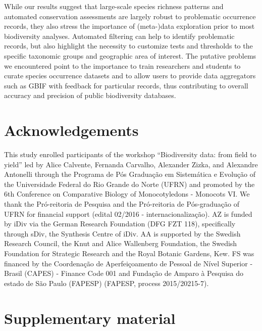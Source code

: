 \documentclass[fleqn,10pt,lineno]{wlpeerj} %
\begin{document}
While our results suggest that large-scale species richness patterns and automated conservation assessments are largely robust to problematic occurrence records, they also stress the importance of (meta-)data exploration prior to most biodiversity analyses. Automated filtering can help to identify problematic records, but also highlight the necessity to customize tests and thresholds to the specific taxonomic groups and geographic area of interest. The putative problems we encountered point to the importance to train researchers and students to curate species occurrence datasets and to allow users to provide data aggregators such as GBIF with feedback for particular records, thus contributing to overall accuracy and precision of public biodiversity databases.

\hypertarget{acknowledgements}{%
\section*{Acknowledgements}\label{acknowledgements}}

This study enrolled participants of the workshop ``Biodiversity data: from field to yield'' led by Alice Calvente, Fernanda Carvalho, Alexander Zizka, and Alexandre Antonelli through the Programa de Pós Graduação em Sistemática e Evolução of the Universidade Federal do Rio Grande do Norte (UFRN) and promoted by the 6th Conference on Comparative Biology of Monocotyledons - Monocots VI. We thank the Pró-reitoria de Pesquisa and the Pró-reitoria de Pós-graduação of UFRN for financial support (edital 02/2016 - internacionalização). AZ is funded by iDiv via the German Research Foundation (DFG FZT 118), specifically through sDiv, the Synthesis Centre of iDiv. AA is supported by the Swedish Research Council, the Knut and Alice Wallenberg Foundation, the Swedish Foundation for Strategic Research and the Royal Botanic Gardens, Kew. FS was financed by the Coordenação de Aperfeiçoamento de Pessoal de Nível Superior - Brasil (CAPES) - Finance Code 001 and Fundação de Amparo à Pesquisa do estado de São Paulo (FAPESP) (FAPESP, process 2015/20215-7).

\hypertarget{supplementary-material}{%
\section*{Supplementary material}\label{supplementary-material}}
\end{document}
